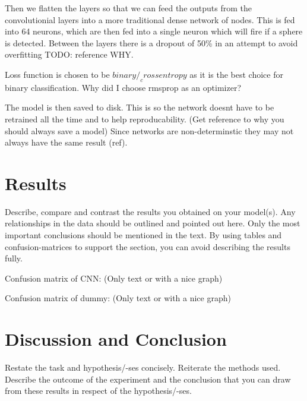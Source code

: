 \documentclass{article}
\begin{document}
Then we flatten the layers so that we can feed the outputs from the convolutionial layers into a more traditional dense network of nodes.
This is fed into 64 neurons, which are then fed into a single neuron which will fire if a sphere is detected.
Between the layers there is a dropout of 50\% in an attempt to avoid overfitting TODO: reference WHY.

Loss function is chosen to be $binary/_crossentropy$ as it is the best choice for binary classification.
Why did I choose rmsprop as an optimizer? 

The model is then saved to disk.
This is so the network doesnt have to be retrained all the time and to help reproducability.
(Get reference to why you should always save a model)
Since networks are non-determinstic they may not always have the same result (ref).


\section{Results}
Describe, compare and contrast the results you obtained on your
model(s). Any relationships in the data should be outlined and pointed
out here. Only the most important conclusions should be mentioned in
the text. By using tables and confusion-matrices to support the section,
you can avoid describing the results fully.

Confusion matrix of CNN:
(Only text or with a nice graph)

Confusion matrix of dummy:
(Only text or with a nice graph)


\section{Discussion and Conclusion}
Restate the task and hypothesis/-ses concisely.
Reiterate the methods used. Describe the outcome of the experiment
and the conclusion that you can draw from these results in respect of the
hypothesis/-ses.

\printbibliography
\end{document}
